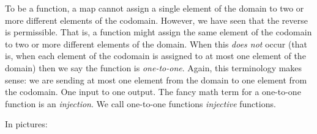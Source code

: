 \documentclass[10pt,]{book}
\theoremstyle{plain}
\theoremstyle{definition}
\theoremstyle{definition}
\theoremstyle{definition}
\numberwithin{equation}{section}
\begin{document}
To be a function, a map cannot assign a single element of the domain to two or more different elements of the codomain. However, we have seen that the reverse is permissible. That is, a function might assign the same element of the codomain to two or more different elements of the domain. When this \emph{does not} occur (that is, when each element of the codomain is assigned to at most one element of the domain) then we say the function is \emph{one-to-one}. Again, this terminology makes sense: we are sending at most one element from the domain to one element from the codomain. One input to one output. The fancy math term for a one-to-one function is an \emph{injection}. We call one-to-one functions \emph{injective} functions.
%
\par

In pictures:
%
{
}
{
}
\end{document}
